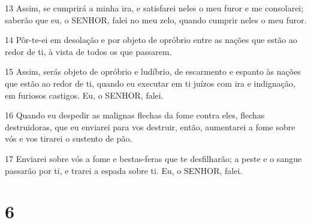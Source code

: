 \par 13 Assim, se cumprirá a minha ira, e satisfarei neles o meu furor e me consolarei; saberão que eu, o SENHOR, falei no meu zelo, quando cumprir neles o meu furor.
\par 14 Pôr-te-ei em desolação e por objeto de opróbrio entre as nações que estão ao redor de ti, à vista de todos os que passarem.
\par 15 Assim, serás objeto de opróbrio e ludíbrio, de escarmento e espanto às nações que estão ao redor de ti, quando eu executar em ti juízos com ira e indignação, em furiosos castigos. Eu, o SENHOR, falei.
\par 16 Quando eu despedir as malignas flechas da fome contra eles, flechas destruidoras, que eu enviarei para vos destruir, então, aumentarei a fome sobre vós e vos tirarei o sustento de pão.
\par 17 Enviarei sobre vós a fome e bestas-feras que te desfilharão; a peste e o sangue passarão por ti, e trarei a espada sobre ti. Eu, o SENHOR, falei.

\chapter{6}

